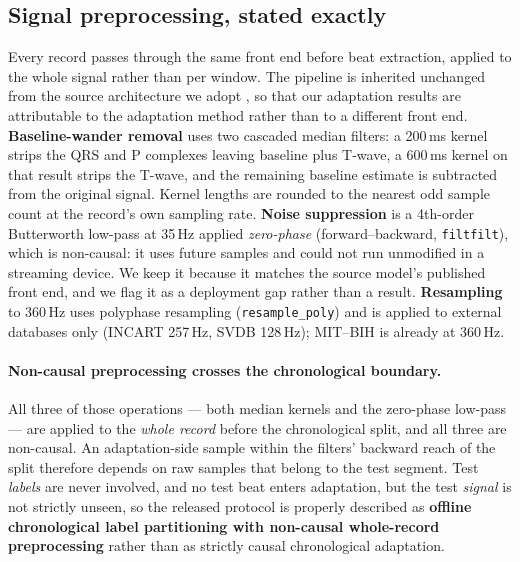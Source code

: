 \subsection{Signal preprocessing, stated exactly}
\label{sec:preproc}

Every record passes through the same front end before beat extraction, applied to
the whole signal rather than per window. The pipeline is inherited unchanged from
the source architecture we adopt \cite{busia2025tiny}, so that our adaptation
results are attributable to the adaptation method rather than to a different
front end.
\textbf{Baseline-wander removal} uses two cascaded median filters: a 200\,ms
kernel strips the QRS and P complexes leaving baseline plus T-wave, a 600\,ms
kernel on that result strips the T-wave, and the remaining baseline estimate is
subtracted from the original signal. Kernel lengths are rounded to the nearest
odd sample count at the record's own sampling rate.
\textbf{Noise suppression} is a 4th-order Butterworth low-pass at 35\,Hz applied
\emph{zero-phase} (forward--backward, \texttt{filtfilt}), which is
non-causal: it uses future samples and could not run unmodified in a streaming
device. We keep it because it matches the source model's published front end, and
we flag it as a deployment gap rather than a result.
\textbf{Resampling} to 360\,Hz uses polyphase resampling
(\texttt{resample\_poly}) and is applied to external databases only (INCART
257\,Hz, SVDB 128\,Hz); MIT--BIH is already at 360\,Hz.

\paragraph{Non-causal preprocessing crosses the chronological boundary.} All
three of those operations --- both median kernels and the zero-phase low-pass ---
are applied to the \emph{whole record} before the chronological split, and all
three are non-causal. An adaptation-side sample within the filters' backward
reach of the split therefore depends on raw samples that belong to the test
segment. Test \emph{labels} are never involved, and no test beat enters
adaptation, but the test \emph{signal} is not strictly unseen, so the released
protocol is properly described as \textbf{offline chronological label
partitioning with non-causal whole-record preprocessing} rather than as strictly
causal chronological adaptation.

